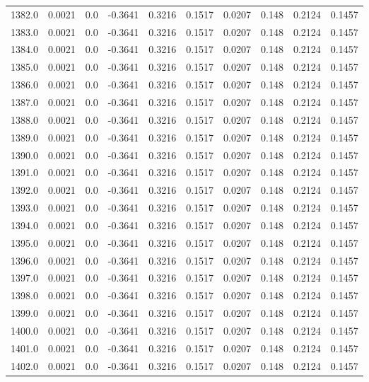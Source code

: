 \begin{longtable}{lrrrrrrrrr}
1382.0 & 0.0021 & 0.0 & -0.3641 & 0.3216 & 0.1517 & 0.0207 & 0.148 & 0.2124 & 0.1457 \\
1383.0 & 0.0021 & 0.0 & -0.3641 & 0.3216 & 0.1517 & 0.0207 & 0.148 & 0.2124 & 0.1457 \\
1384.0 & 0.0021 & 0.0 & -0.3641 & 0.3216 & 0.1517 & 0.0207 & 0.148 & 0.2124 & 0.1457 \\
1385.0 & 0.0021 & 0.0 & -0.3641 & 0.3216 & 0.1517 & 0.0207 & 0.148 & 0.2124 & 0.1457 \\
1386.0 & 0.0021 & 0.0 & -0.3641 & 0.3216 & 0.1517 & 0.0207 & 0.148 & 0.2124 & 0.1457 \\
1387.0 & 0.0021 & 0.0 & -0.3641 & 0.3216 & 0.1517 & 0.0207 & 0.148 & 0.2124 & 0.1457 \\
1388.0 & 0.0021 & 0.0 & -0.3641 & 0.3216 & 0.1517 & 0.0207 & 0.148 & 0.2124 & 0.1457 \\
1389.0 & 0.0021 & 0.0 & -0.3641 & 0.3216 & 0.1517 & 0.0207 & 0.148 & 0.2124 & 0.1457 \\
1390.0 & 0.0021 & 0.0 & -0.3641 & 0.3216 & 0.1517 & 0.0207 & 0.148 & 0.2124 & 0.1457 \\
1391.0 & 0.0021 & 0.0 & -0.3641 & 0.3216 & 0.1517 & 0.0207 & 0.148 & 0.2124 & 0.1457 \\
1392.0 & 0.0021 & 0.0 & -0.3641 & 0.3216 & 0.1517 & 0.0207 & 0.148 & 0.2124 & 0.1457 \\
1393.0 & 0.0021 & 0.0 & -0.3641 & 0.3216 & 0.1517 & 0.0207 & 0.148 & 0.2124 & 0.1457 \\
1394.0 & 0.0021 & 0.0 & -0.3641 & 0.3216 & 0.1517 & 0.0207 & 0.148 & 0.2124 & 0.1457 \\
1395.0 & 0.0021 & 0.0 & -0.3641 & 0.3216 & 0.1517 & 0.0207 & 0.148 & 0.2124 & 0.1457 \\
1396.0 & 0.0021 & 0.0 & -0.3641 & 0.3216 & 0.1517 & 0.0207 & 0.148 & 0.2124 & 0.1457 \\
1397.0 & 0.0021 & 0.0 & -0.3641 & 0.3216 & 0.1517 & 0.0207 & 0.148 & 0.2124 & 0.1457 \\
1398.0 & 0.0021 & 0.0 & -0.3641 & 0.3216 & 0.1517 & 0.0207 & 0.148 & 0.2124 & 0.1457 \\
1399.0 & 0.0021 & 0.0 & -0.3641 & 0.3216 & 0.1517 & 0.0207 & 0.148 & 0.2124 & 0.1457 \\
1400.0 & 0.0021 & 0.0 & -0.3641 & 0.3216 & 0.1517 & 0.0207 & 0.148 & 0.2124 & 0.1457 \\
1401.0 & 0.0021 & 0.0 & -0.3641 & 0.3216 & 0.1517 & 0.0207 & 0.148 & 0.2124 & 0.1457 \\
1402.0 & 0.0021 & 0.0 & -0.3641 & 0.3216 & 0.1517 & 0.0207 & 0.148 & 0.2124 & 0.1457 \\

\end{longtable}
